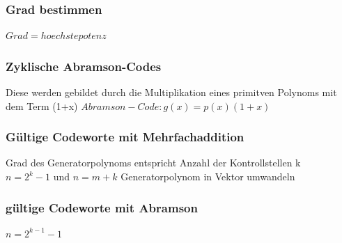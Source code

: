 \subsubsection{Grad bestimmen}
\colorbox{lightlightgrey}{$Grad = hoechste potenz$}

\subsubsection{Zyklische Abramson-Codes}
Diese werden gebildet durch die Multiplikation eines primitven Polynoms mit dem Term (1+x)
\colorbox{lightlightgrey}{$Abramson-Code: g(x)= p(x) (1+x)$}


\subsubsection{Gültige Codeworte mit Mehrfachaddition}
Grad des Generatorpolynoms entspricht Anzahl der Kontrollstellen k\\
$n = 2^k - 1$ und $n = m + k$
Generatorpolynom in Vektor umwandeln\\


\subsubsection{gü̈ltige Codeworte mit Abramson}
$n = 2^{k-1} - 1$


\vfill
$$
\columnbreak